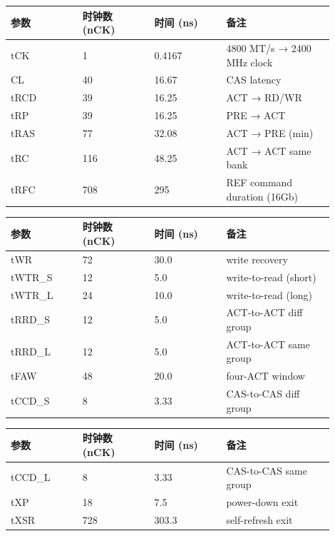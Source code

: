 \begin{longtable}{L{0.2\linewidth}L{0.2\linewidth}L{0.2\linewidth}L{0.3\linewidth}}
\toprule
参数 & 时钟数 (nCK) & 时间 (ns) & 备注 \\
\midrule
tCK & 1 & 0.4167 & 4800 MT/s → 2400 MHz clock \\\tablerowrule
CL & 40 & 16.67 & CAS latency \\\tablerowrule
tRCD & 39 & 16.25 & ACT → RD/WR \\\tablerowrule
tRP & 39 & 16.25 & PRE → ACT \\\tablerowrule
tRAS & 77 & 32.08 & ACT → PRE (min) \\\tablerowrule
tRC & 116 & 48.25 & ACT → ACT same bank \\\tablerowrule
tRFC & 708 & 295 & REF command duration (16Gb) \\
\bottomrule
\end{longtable}

\begin{longtable}{L{0.2\linewidth}L{0.2\linewidth}L{0.2\linewidth}L{0.3\linewidth}}
\toprule
参数 & 时钟数 (nCK) & 时间 (ns) & 备注 \\
\midrule
tWR & 72 & 30.0 & write recovery \\\tablerowrule
tWTR\_S & 12 & 5.0 & write-to-read (short) \\\tablerowrule
tWTR\_L & 24 & 10.0 & write-to-read (long) \\\tablerowrule
tRRD\_S & 12 & 5.0 & ACT-to-ACT diff group \\\tablerowrule
tRRD\_L & 12 & 5.0 & ACT-to-ACT same group \\\tablerowrule
tFAW & 48 & 20.0 & four-ACT window \\\tablerowrule
tCCD\_S & 8 & 3.33 & CAS-to-CAS diff group \\
\bottomrule
\end{longtable}

\begin{longtable}{L{0.2\linewidth}L{0.2\linewidth}L{0.2\linewidth}L{0.3\linewidth}}
\toprule
参数 & 时钟数 (nCK) & 时间 (ns) & 备注 \\
\midrule
tCCD\_L & 8 & 3.33 & CAS-to-CAS same group \\\tablerowrule
tXP & 18 & 7.5 & power-down exit \\\tablerowrule
tXSR & 728 & 303.3 & self-refresh exit \\
\bottomrule
\end{longtable}

